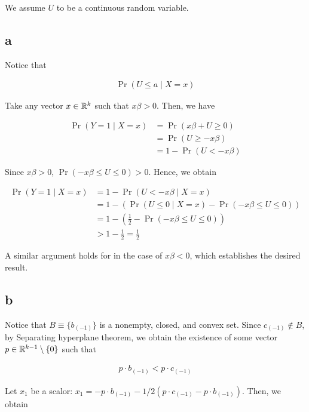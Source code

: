 \documentclass[11pt]{article}
\begin{document}
We assume $U$ to be a continuous random variable.

\subsection*{a}\label{q:4_a}

Notice that

\begin{align*}
    \Pr(U \leq a \mid X = x)
\end{align*}

Take any vector $x\in \mathbb{R}^k$ such that $x\beta > 0$. Then, we have

\begin{align*}
    \Pr(Y = 1 \mid X = x)
    &= \Pr(x\beta + U \geq 0) \\
    &= \Pr(U \geq - x\beta) \\
    &= 1 - \Pr(U < - x\beta)
\end{align*}

Since $x\beta > 0$, $\Pr(- x\beta \leq U \leq 0) > 0$. Hence, we obtain

\begin{align*}
    \Pr(Y = 1 \mid X = x)
    &= 1 - \Pr(U < - x\beta \mid X = x) \\
    &= 1 - \left( \Pr(U \leq 0 \mid X = x) - \Pr(- x\beta \leq U \leq 0) \right) \\
    &= 1 - \left( \frac{1}{2} - \Pr(- x\beta \leq U \leq 0) \right) \\
    &> 1 - \frac{1}{2} = \frac{1}{2}
\end{align*}

A similar argument holds for in the case of $x\beta < 0$, which establishes the desired result.

\subsection*{b}\label{q:4_b}

Notice that $B \equiv \{b_{(-1)}\}$ is a nonempty, closed, and convex set. Since $c_{(-1)} \notin B$, by Separating hyperplane theorem, we obtain the existence of some vector $p \in \mathbb{R}^{k-1}\setminus \{0\}$ such that

\begin{align*}
    p \cdot b_{(-1)} < p \cdot c_{(-1)}
\end{align*}

Let $x_1$ be a scalor: $x_1 = - p \cdot b_{(-1)} - 1/2 (p\cdot c_{(-1)} - p \cdot b_{(-1)})$. Then, we obtain
\end{document}
